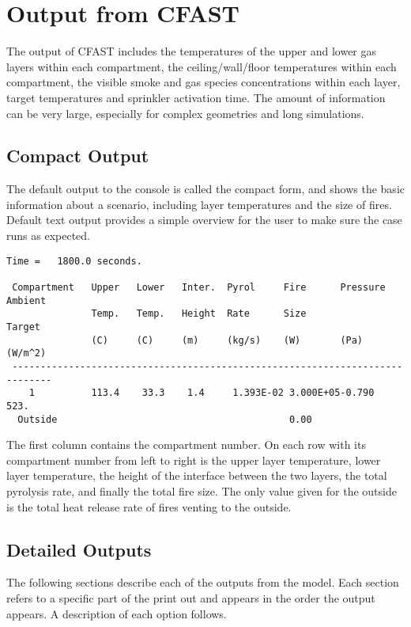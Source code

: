 \chapter{Output from CFAST}

The output of CFAST includes the temperatures of the upper and lower gas layers within each compartment, the ceiling/wall/floor temperatures within each compartment, the visible smoke and gas species concentrations within each layer, target temperatures and sprinkler activation time.  The amount of information can be very large, especially for complex geometries and long simulations.

\section{Compact Output}

The default output to the console is called the compact form, and shows the basic information about a scenario, including layer temperatures and the size of fires. Default text output provides a simple overview for the user to make sure the case runs as expected.
\begin{lstlisting}[basicstyle=\scriptsize]
 Time =   1800.0 seconds.

 Compartment   Upper   Lower   Inter.  Pyrol     Fire      Pressure  Ambient
               Temp.   Temp.   Height  Rate      Size                Target
               (C)     (C)     (m)     (kg/s)    (W)       (Pa)      (W/m^2)
 -----------------------------------------------------------------------------
    1          113.4    33.3    1.4     1.393E-02 3.000E+05-0.790      523.
  Outside                                         0.00
\end{lstlisting}
The first column contains the compartment number.  On each row with its compartment number from left to right is the upper layer temperature, lower layer temperature, the height of the interface between the two layers, the total pyrolysis rate, and finally the total fire size.  The only value given for the outside is the total heat release rate of fires venting to the outside.

\section{Detailed Outputs}

The following sections describe each of the outputs from the model.  Each section refers to a specific part of the print out and appears in the order the output appears. A description of each option follows.

